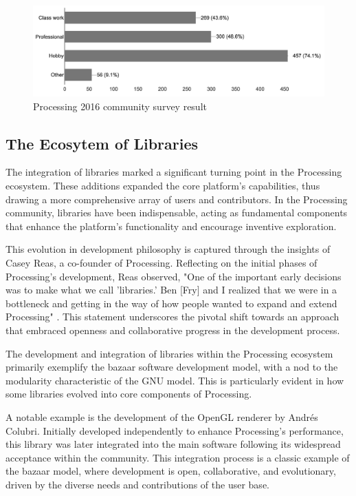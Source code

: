 \begin{figure}[h!]
	\centering
	\includegraphics[width=\textwidth]{images/community-survey.png}
	\caption{Processing 2016 community survey result \parencite{processingfoundation2016CommunitySurvey2016}}
	\label{fig:community_survey}
\end{figure}

\subsection{The Ecosytem of Libraries}
The integration of libraries marked a significant turning point in the Processing ecosystem. These additions expanded the core platform's capabilities, thus drawing a more comprehensive array of users and contributors. In the Processing community, libraries have been indispensable, acting as fundamental components that enhance the platform's functionality and encourage inventive exploration.

This evolution in development philosophy is captured through the insights of Casey Reas, a co-founder of Processing. Reflecting on the initial phases of Processing's development, Reas observed, "One of the important early decisions was to make what we call 'libraries.' Ben [Fry] and I realized that we were in a bottleneck and getting in the way of how people wanted to expand and extend Processing" \parencite[329]{conradGraphicDesignPostdigital2021}. This statement underscores the pivotal shift towards an approach that embraced openness and collaborative progress in the development process.

The development and integration of libraries within the Processing ecosystem primarily exemplify the bazaar software development model, with a nod to the modularity characteristic of the GNU model. This is particularly evident in how some libraries evolved into core components of Processing.

A notable example is the development of the OpenGL renderer by Andrés Colubri. Initially developed independently to enhance Processing's performance, this library was later integrated into the main software following its widespread acceptance within the community. This integration process is a classic example of the bazaar model, where development is open, collaborative, and evolutionary, driven by the diverse needs and contributions of the user base.  \parencite{fryProcessingContributionGuide2022}

